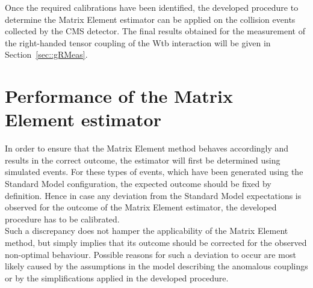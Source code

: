 %
%
Once the required calibrations have been identified, the developed procedure to determine the Matrix Element estimator can be applied on the collision events collected by the CMS detector.
The final results obtained for the measurement of the right-handed tensor coupling of the Wtb interaction will be given in Section~\ref{sec::gRMeas}.

\section{Performance of the Matrix Element estimator} \label{sec::EstimatorProp} %

In order to ensure that the Matrix Element method behaves accordingly and results in the correct outcome, the estimator will first be determined using simulated events.
For these types of events, which have been generated using the Standard Model configuration, the expected outcome should be fixed by definition. 
Hence in case any deviation from the Standard Model expectations is observed for the outcome of the Matrix Element estimator, the developed procedure has to be calibrated.
\\
Such a discrepancy does not hamper the applicability of the Matrix Element method, but simply implies that its outcome should be corrected for the observed non-optimal behaviour.
Possible reasons for such a deviation to occur are most likely caused by the assumptions in the model describing the anomalous couplings or by the simplifications applied in the developed procedure.
\\

